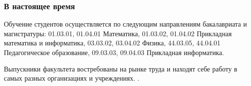 \documentclass[pdf,hyperref={unicode}, aspectratio=43, serif,11pt]{beamer}
\begin{document}
\begin{frame}
\frametitle{В настоящее время}
\tiny{


Обучение студентов осуществляется по следующим направлениям бакалавриата и магистратуры: 01.03.01, 01.04.01 Математика, 01.03.02, 01.04.02 Прикладная математика и информатика, 03.03.02, 03.04.02 Физика, 44.03.05, 44.04.01 Педагогическое образование, 09.03.03, 09.04.03 Прикладная информатика.

Выпускники факультета востребованы на рынке труда и находят себе работу в самых разных организациях и учреждениях.
.}
\begin{figure}[!h]
\centering
{}
\end{figure}

\end{frame}
\end{document}
